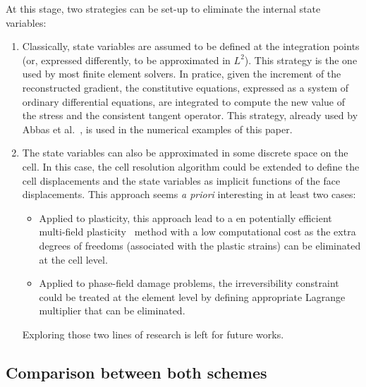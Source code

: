 At this stage, two strategies can be set-up to eliminate the internal
state variables:
\begin{enumerate}
  \item Classically, state variables are assumed to be defined at
  the integration points (or, expressed differently, to be approximated
  in \(L^{2}\)). This strategy is the one used by most finite element
  solvers. In pratice, given the increment of the reconstructed
  gradient, the constitutive equations, expressed as a system of
  ordinary differential equations, are integrated to compute the new
  value of the stress and the consistent tangent operator. This
  strategy, already used by Abbas et
  al.~\cite{abbas_hybrid_2018,abbas_hybrid_2019}, is used in the
  numerical examples of this paper.
  \item The state variables can also be approximated in some
  discrete space on the cell. In this case, the cell resolution
  algorithm could be extended to define the cell displacements and the
  state variables as implicit functions of the face displacements. This
  approach seems \textit{a priori} interesting in at least two cases:
  \begin{itemize}
    \item Applied to plasticity, this approach lead to a en
    potentially efficient multi-field
    plasticity~\cite{simo_computational_1998} method with a low
    computational cost as the extra degrees of freedoms (associated with
    the plastic strains) can be eliminated at the cell level.
    \item Applied to phase-field damage problems, the
    irreversibility constraint could be treated at the element level by
    defining appropriate Lagrange multiplier that can be eliminated.
  \end{itemize}
  Exploring those two lines of research is left for future
  works.
\end{enumerate}


\subsection{Comparison between both schemes}
\label{par_cell_eq}

